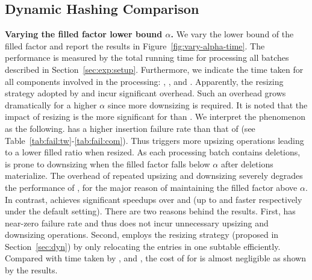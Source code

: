\subsection{Dynamic Hashing Comparison}\label{sec:exp:dynamic}

\vspace{1mm}\noindent\textbf{Varying the filled factor lower bound $\alpha$.}
We vary the lower bound of the filled factor and report the results in Figure~\ref{fig:vary-alpha-time}. 
The performance is measured by the total running time for processing all batches described in Section~\ref{sec:exp:setup}. Furthermore, we indicate the time taken for all components involved in the processing: , ,  and . Apparently, the resizing strategy adopted by \linear and \megakv incur significant overhead. Such an overhead grows dramatically for a higher $\alpha$ since more downsizing is required. It is noted that the impact of resizing is the more significant for \megakv than \linear. We interpret the phenomenon as the following.
\megakv has a higher insertion failure rate than that of \linear (see Table~\ref{tab:fail:tw}-\ref{tab:fail:com}). Thus \megakv triggers more upsizing operations leading to a lower filled ratio when resized. As each processing batch contains deletions, \megakv is prone to downsizing when the filled factor falls below $\alpha$ after deletions materialize.
The overhead of repeated upsizing and downsizing severely degrades the performance of \megakv, for the major reason of maintaining the filled factor above $\alpha$. 
In contrast, \voter achieves significant speedups over \linear and \megakv (up to \xxx and \xxx faster respectively under the default setting). There are two reasons behind the results. First, \voter has near-zero failure rate and thus does not incur unnecessary upsizing and downsizing operations. Second, \voter employs the resizing strategy (proposed in Section~\ref{sec:dyn}) by only relocating the entries in one subtable efficiently. 
Compared with time taken by ,  and , the cost of  for \voter is almost negligible as shown by the results. 


